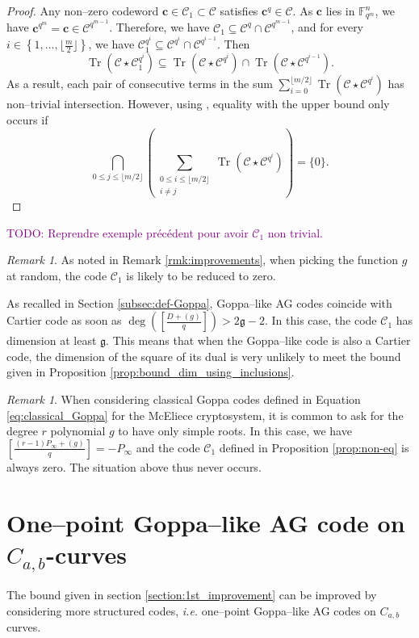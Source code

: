 \documentclass[a4paper]{amsart}
\theoremstyle{definition}
\theoremstyle{remark}
\newtheorem{remark}[thm]{Remark}
\newcommand{\calC}{\mathcal{C}}
\newcommand{\fqm}{\mathbb{F}_{q^m}}
\newcommand{\Tr}[1]{\operatorname{Tr}\left(#1\right)}
\newcommand{\set}[1]{\left\{#1\right\}}
\newcommand\jade[1]{\textcolor{purple}{#1}}
\begin{document}
\begin{proof}
Any non--zero codeword $\mathbf{c} \in  \calC_1 \subset \calC$ satisfies $\mathbf{c}^q \in \calC$. As $\mathbf{c}$ lies in $\fqm^n$, we have $\mathbf{c}^{q^m}=\mathbf{c} \in \calC^{q^{m-1}}$. Therefore,  we have $\calC_1 \subseteq \calC^{q} \cap \calC^{q^{m-1}}$, and for every $i \in \set{1,\dots,\lfloor \frac{m}{2}\rfloor}$, we have $\calC_1^{q^i} \subseteq \calC^{q^i} \cap \calC^{q^{i-1}}$. Then
\[\Tr{\calC\star\calC_1^{q^i}} \subseteq \Tr{\calC\star\calC^{q^i}} \cap \Tr{\calC\star\calC^{q^{i-1}}}.\]
As a result, each pair of consecutive terms in the sum $\sum\limits_{i=0}^{\lfloor m/2 \rfloor} \Tr{\calC \star \calC^{q^i}}$ has non--trivial intersection. However, using \cite[Theorem~2]{T19}, equality with the upper bound only occurs if
\[\bigcap_{0\leq j \leq \lfloor m/2\rfloor} \left( \sum_{\substack{0\leq i \leq \lfloor m/2 \rfloor\\ i\neq j}} \Tr{\calC \star \calC^{q^i}} \right)= \{0\}.\]
\end{proof}

\jade{TODO: Reprendre exemple précédent pour avoir $\calC_1$ non trivial.}

\begin{remark}
	As noted in Remark \ref{rmk:improvements}, when picking the function $g$ at random, the code $\calC_1$ is likely to be reduced to zero.
\end{remark}

As recalled in Section \ref{subsec:def-Goppa}, Goppa--like AG codes coincide with Cartier code as soon as $\deg\left(\left[ \frac{D+(g)}{q} \right] \right) > 2 \mathfrak{g}-2$. In this case, the code $\calC_1$ has dimension at least $\mathfrak{g}$. This means that when the Goppa--like code is also a Cartier code, the dimension of the square of its dual is very unlikely to meet the bound given in Proposition \ref{prop:bound_dim_using_inclusions}.

\begin{remark}
	When considering classical Goppa codes defined in Equation \eqref{eq:classical_Goppa} for the McEliece cryptosystem, it is common to ask for the degree $r$ polynomial $g$ to have only simple roots. In this case, we have $ \left[ \frac{(r-1)P_\infty+(g)}{q} \right] = -P_\infty$ and the code $\calC_1$ defined in Proposition \ref{prop:non-eq} is always zero. The situation above thus never occurs.
\end{remark}

\section{One--point Goppa--like AG code on $C_{a,b}$-curves}\label{sec:AG-C_a,b}
The bound given in section \ref{section:1st_improvement} can be improved by considering more structured codes, \emph{i.e.} one--point Goppa--like AG codes on $C_{a,b}$ curves.
\end{document}
